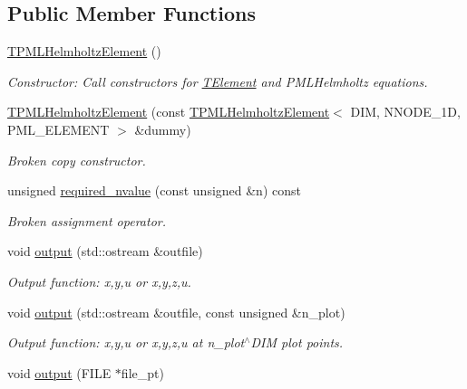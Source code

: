 \subsection*{Public Member Functions}
\begin{DoxyCompactItemize}
\item 
\hyperlink{classoomph_1_1TPMLHelmholtzElement_ada189053695a482366ab20995d5f8e6c}{T\+P\+M\+L\+Helmholtz\+Element} ()
\begin{DoxyCompactList}\small\item\em Constructor\+: Call constructors for \hyperlink{classoomph_1_1TElement}{T\+Element} and P\+M\+L\+Helmholtz equations. \end{DoxyCompactList}\item 
\hyperlink{classoomph_1_1TPMLHelmholtzElement_a5637fe67c7d299b2d387c86b09464603}{T\+P\+M\+L\+Helmholtz\+Element} (const \hyperlink{classoomph_1_1TPMLHelmholtzElement}{T\+P\+M\+L\+Helmholtz\+Element}$<$ D\+IM, N\+N\+O\+D\+E\+\_\+1D, P\+M\+L\+\_\+\+E\+L\+E\+M\+E\+NT $>$ \&dummy)
\begin{DoxyCompactList}\small\item\em Broken copy constructor. \end{DoxyCompactList}\item 
unsigned \hyperlink{classoomph_1_1TPMLHelmholtzElement_a8fbaaffdd7addb9e6912d92a2fa406c4}{required\+\_\+nvalue} (const unsigned \&n) const
\begin{DoxyCompactList}\small\item\em Broken assignment operator. \end{DoxyCompactList}\item 
void \hyperlink{classoomph_1_1TPMLHelmholtzElement_a9dbd17c84f5b1f058ba8373daa03f7cd}{output} (std\+::ostream \&outfile)
\begin{DoxyCompactList}\small\item\em Output function\+: x,y,u or x,y,z,u. \end{DoxyCompactList}\item 
void \hyperlink{classoomph_1_1TPMLHelmholtzElement_aa261cc229bf205167b1105e55385862b}{output} (std\+::ostream \&outfile, const unsigned \&n\+\_\+plot)
\begin{DoxyCompactList}\small\item\em Output function\+: x,y,u or x,y,z,u at n\+\_\+plot$^\wedge$\+D\+IM plot points. \end{DoxyCompactList}\item 
void \hyperlink{classoomph_1_1TPMLHelmholtzElement_a71d5ae7a30f3f20a89fa20f5b84e2bef}{output} (F\+I\+LE $\ast$file\+\_\+pt)

\end{DoxyCompactItemize}

